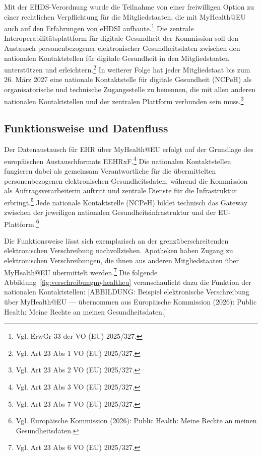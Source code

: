 Mit der EHDS-Verordnung wurde die Teilnahme von einer freiwilligen Option zu einer rechtlichen Verpflichtung für die Mitgliedstaaten, die mit MyHealth@EU auch auf den Erfahrungen von eHDSI aufbaute.\footnote{Vgl. ErwGr 33 der VO (EU) 2025/327.} Die zentrale Interoperabilitätsplattform für digitale Gesundheit der Kommission soll den Austausch personenbezogener elektronischer Gesundheitsdaten zwischen den nationalen Kontaktstellen für digitale Gesundheit in den Mitgliedstaaten unterstützen und erleichtern.\footnote{Vgl. Art 23 Abs 1 VO (EU) 2025/327.} In weiterer Folge hat jeder Mitgliedstaat
bis zum 26. März 2027 eine nationale Kontaktstelle für digitale Gesundheit (NCPeH) als organisatorische und technische Zugangsstelle zu benennen, die mit allen anderen nationalen Kontaktstellen und der zentralen Plattform verbunden sein muss.\footnote{Vgl. Art 23 Abs 2 VO (EU) 2025/327.}

    \subsection{Funktionsweise und Datenfluss}
Der Datenaustausch für EHR über MyHealth@EU erfolgt auf der Grundlage des europäischen Austauschformats EEHRxF.\footnote{Vgl. Art 23 Abs 3 VO (EU) 2025/327.} Die nationalen Kontaktstellen fungieren dabei als gemeinsam Verantwortliche für die übermittelten personenbezogenen elektronischen Gesundheitsdaten, während die Kommission als Auftragsverarbeiterin auftritt und zentrale Dienste für die Infrastruktur erbringt.\footnote{Vgl. Art 23 Abs 7 VO (EU) 2025/327.} Jede nationale Kontaktstelle (NCPeH) bildet technisch das Gateway zwischen der jeweiligen nationalen Gesundheitsinfrastruktur und der EU-Plattform.\footnote{Vgl. Europäische Kommission (2026): Public Health: Meine Rechte an meinen Gesundheitsdaten.}

Die Funktionsweise lässt sich exemplarisch an der grenzüberschreitenden elektronischen Verschreibung nachvollziehen. Apotheken haben Zugang zu elektronischen Verschreibungen, die ihnen aus anderen Mitgliedstaaten über MyHealth@EU übermittelt werden.\footnote{Vgl. Art 23 Abs 6 VO (EU) 2025/327.} Die folgende Abbildung~\ref{fig:verschreibungmyhealtheu} veranschaulicht dazu die Funktion der nationalen Kontaktstellen:
[ABBILDUNG: Beispiel elektronische Verschreibung über MyHealth@EU — übernommen aus Europäische Kommission (2026): Public Health: Meine Rechte an meinen Gesundheitsdaten.]

